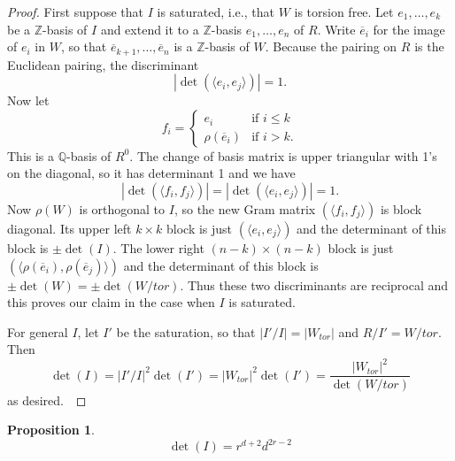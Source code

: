 \documentclass[reqno]{amsart}
\newtheorem{prop}[thm]{Proposition}
\theoremstyle{definition}
\theoremstyle{remark}
\def\Q{\mathbb{Q}}
\def\Z{\mathbb{Z}}
\begin{document}
\begin{proof}
First suppose that $I$ is saturated, i.e., that $W$ is torsion free.
Let $e_1,\dots,e_k$ be a $\Z$-basis of $I$ and extend it to a
$\Z$-basis $e_1,\dots,e_n$ of $R$.  Write $\overline e_i$ for the
image of $e_i$ in $W$, so that $\overline e_{k+1},\dots,\overline e_n$
is a $\Z$-basis of $W$.  Because the pairing on $R$ is the Euclidean
pairing, the discriminant 
$$\left|\det\left(\langle e_i,e_j\rangle\right)\right|=1.$$
Now let 
$$f_i=\begin{cases}
e_i&\text{if $i\le k$}\\
\rho(\overline e_i)&\text{if $i>k$.}
\end{cases}
$$
This is a $\Q$-basis of $R^0$.  The change of basis matrix is upper
triangular with 1's on the diagonal, so it has determinant 1 and we
have
$$\left|\det\left(\langle f_i,f_j\rangle\right)\right|=
\left|\det\left(\langle e_i,e_j\rangle\right)\right|=1.$$ Now
$\rho(W)$ is orthogonal to $I$, so the new Gram matrix
$\left(\langle f_i,f_j\rangle\right)$ is block diagonal.  Its upper left
$k\times k$ block is just $\left(\langle e_i,e_j\rangle\right)$ and
the determinant of this block is $\pm\det(I)$.  The lower right
$(n-k)\times(n-k)$ block is just $\left(\langle \rho(\overline
  e_i),\rho(\overline e_j)\rangle\right)$ and the determinant of
this block is $\pm\det(W)=\pm\det(W/tor)$.  Thus these two
discriminants are reciprocal and this proves our claim in the case when
$I$ is saturated.

For general $I$, let $I'$ be the saturation, so that $|I'/I|=|W_{tor}|$
and $R/I'=W/tor$.  Then 
$$\det(I)=|I'/I|^2\det(I')=|W_{tor}|^2\det(I')=\frac{|W_{tor}|^2}{\det(W/tor)}$$
as desired.\
\end{proof}


\begin{prop}
$$\det(I)=r^{d+2}d^{2r-2}$$
\end{prop}
\end{document}
